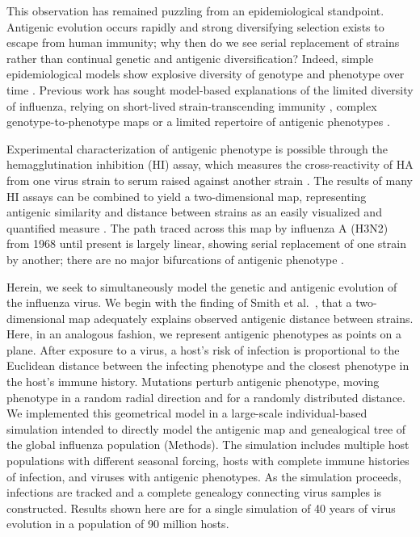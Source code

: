 This observation has remained puzzling from an epidemiological standpoint.  Antigenic evolution occurs rapidly and strong diversifying selection exists to escape from human immunity; why then do we see serial replacement of strains rather than continual genetic and antigenic diversification?  Indeed, simple epidemiological models show explosive diversity of genotype and phenotype over time \cite{Ferguson03,Tria05}.  Previous work has sought model-based explanations of the limited diversity of influenza, relying on short-lived strain-transcending immunity \cite{Ferguson03,Tria05}, complex genotype-to-phenotype maps \cite{Koelle06} or a limited repertoire of antigenic phenotypes \cite{Recker07}. 

Experimental characterization of antigenic phenotype is possible through the hemagglutination inhibition (HI) assay, which measures the cross-reactivity of HA from one virus strain to serum raised against another strain \cite{Hirst43}.  The results of many HI assays can be combined to yield a two-dimensional map, representing antigenic similarity and distance between strains as an easily visualized and quantified measure \cite{Smith04}.  The path traced across this map by influenza A (H3N2) from 1968 until present is largely linear, showing serial replacement of one strain by another; there are no major bifurcations of antigenic phenotype \cite{Smith04}.

Herein, we seek to simultaneously model the genetic and antigenic evolution of the influenza virus.  We begin with the finding of Smith et al.\ \cite{Smith04}, that a two-dimensional map adequately explains observed antigenic distance between strains.  Here, in an analogous fashion, we represent antigenic phenotypes as points on a plane.  After exposure to a virus, a host's risk of infection is proportional to the Euclidean distance between the infecting phenotype and the closest phenotype in the host's immune history.  Mutations perturb antigenic phenotype, moving phenotype in a random radial direction and for a randomly distributed distance.  We implemented this geometrical model in a large-scale individual-based simulation intended to directly model the antigenic map and genealogical tree of the global influenza population (Methods).  The simulation includes multiple host populations with different seasonal forcing, hosts with complete immune histories of infection, and viruses with antigenic phenotypes.  As the simulation proceeds, infections are tracked and a complete genealogy connecting virus samples is constructed.  Results shown here are for a single simulation of 40 years of virus evolution in a population of 90 million hosts.  

